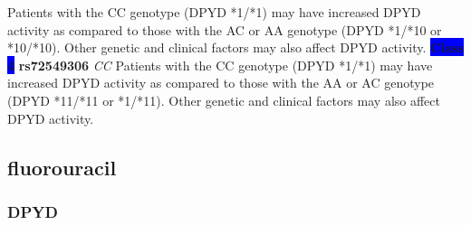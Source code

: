 \documentclass{book}
\begin{document}
\begin{center}
Patients with the CC genotype (DPYD *1/*1) may have increased DPYD activity as compared to those with the AC or AA genotype (DPYD *1/*10 or *10/*10). Other genetic and clinical factors may also affect DPYD activity. \textbf{\colorbox{blue} {Class 4}} \textbf{ rs72549306 } \textit{ CC }
Patients with the CC genotype (DPYD *1/*1) may have increased DPYD activity as compared to those with the AA or AC genotype (DPYD *11/*11 or *1/*11). Other genetic and clinical factors may also affect DPYD activity.

\end{center}\subsection{ fluorouracil }


\subsubsection{ DPYD }
\end{document}
